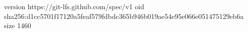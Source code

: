 version https://git-lfs.github.com/spec/v1
oid sha256:d1cc5701f17120a5feaf579fdbdc365b946b019ae54e95e066e051475129eb6a
size 1460

